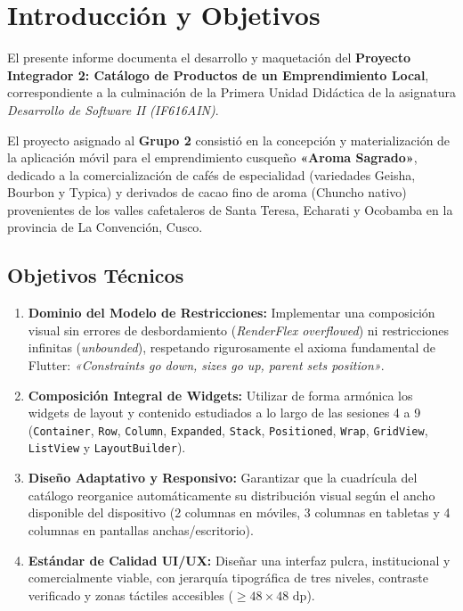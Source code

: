 \documentclass[12pt,a4paper]{article}
\begin{document}
\newpage

\section{Introducción y Objetivos}

El presente informe documenta el desarrollo y maquetación del \textbf{Proyecto Integrador 2: Catálogo de Productos de un Emprendimiento Local}, correspondiente a la culminación de la Primera Unidad Didáctica de la asignatura \textit{Desarrollo de Software II (IF616AIN)}.

El proyecto asignado al \textbf{Grupo 2} consistió en la concepción y materialización de la aplicación móvil para el emprendimiento cusqueño \textbf{«Aroma Sagrado»}, dedicado a la comercialización de cafés de especialidad (variedades Geisha, Bourbon y Typica) y derivados de cacao fino de aroma (Chuncho nativo) provenientes de los valles cafetaleros de Santa Teresa, Echarati y Ocobamba en la provincia de La Convención, Cusco.

\subsection{Objetivos Técnicos}
\begin{enumerate}[leftmargin=*]
    \item \textbf{Dominio del Modelo de Restricciones:} Implementar una composición visual sin errores de desbordamiento (\textit{RenderFlex overflowed}) ni restricciones infinitas (\textit{unbounded}), respetando rigurosamente el axioma fundamental de Flutter: \textit{«Constraints go down, sizes go up, parent sets position»}.
    \item \textbf{Composición Integral de Widgets:} Utilizar de forma armónica los widgets de layout y contenido estudiados a lo largo de las sesiones 4 a 9 (\texttt{Container}, \texttt{Row}, \texttt{Column}, \texttt{Expanded}, \texttt{Stack}, \texttt{Positioned}, \texttt{Wrap}, \texttt{GridView}, \texttt{ListView} y \texttt{LayoutBuilder}).
    \item \textbf{Diseño Adaptativo y Responsivo:} Garantizar que la cuadrícula del catálogo reorganice automáticamente su distribución visual según el ancho disponible del dispositivo (2 columnas en móviles, 3 columnas en tabletas y 4 columnas en pantallas anchas/escritorio).
    \item \textbf{Estándar de Calidad UI/UX:} Diseñar una interfaz pulcra, institucional y comercialmente viable, con jerarquía tipográfica de tres niveles, contraste verificado y zonas táctiles accesibles ($\ge 48 \times 48\text{ dp}$).
\end{enumerate}
\end{document}
